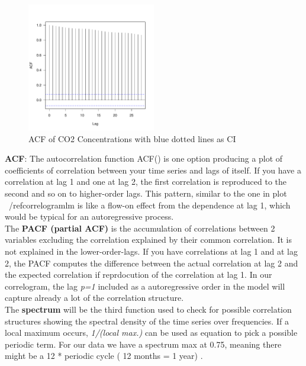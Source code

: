 \documentclass[10pt, a4paper]{article} %
\begin{document}
\begin{figure}[H]
 \begin{center}
\includegraphics[width=0.5\textwidth]{FINAL_VERSION-correlogramlm.pdf}
 \caption{ACF of CO2 Concentrations with blue dotted lines as CI}
\label{correlogramlm}
\end{center}
\end{figure}

\noindent   \textbf{ACF}:  The autocorrelation function ACF() is one option producing a  plot of coefficients of correlation between your time series and lags of itself.   If you have a correlation at lag 1 and one at lag 2, the first correlation is reproduced to the second and so on to higher-order lags. This pattern, similar to the one in plot ~/ref{correlogramlm} is like a flow-on effect from the dependence at lag 1, which would be typical for an autoregressive process. \\
The \textbf{PACF (partial ACF)} is the accumulation of correlations between 2 variables excluding the correlation explained by their common correlation. It is not explained in the lower-order-lags. If you have correlations at lag 1 and at lag 2, the PACF computes the difference between the actual correlation at lag 2 and the expected correlation if reprdocution of the correlation at lag 1.  In our correlogram, the lag \emph{p=1}  included  as a autoregressive order in the model will capture already a lot of the correlation structure. \\
	The \textbf{spectrum} will be the third function used to check for possible correlation structures  showing the spectral density of the time series over frequencies. If a local maximum occurs,  \emph{1/(local max.)} can be used as equation to pick a possible periodic term. For our data we have a spectrum max at 0.75, meaning there might be a 12 * periodic cycle ( 12 months = 1 year) . \\
\end{document}
